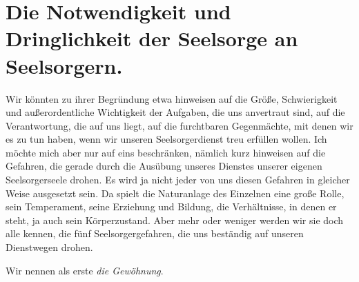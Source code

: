 \documentclass[a5paper,openany]{book}
\begin{document}
\chapter{Die Notwendigkeit und Dringlichkeit der Seelsorge an Seelsorgern.}
Wir könnten zu ihrer Begründung etwa hinweisen auf die Größe, Schwierigkeit und außerordentliche Wichtigkeit der Aufgaben, die uns anvertraut sind, auf die Verantwortung, die auf uns liegt, auf die furchtbaren Gegenmächte, mit denen wir es zu tun haben, wenn wir unseren Seelsorgerdienst treu erfüllen wollen. Ich möchte mich aber nur auf eins beschränken, nämlich kurz hinweisen auf die Gefahren, die gerade durch die Ausübung unseres Dienstes unserer eigenen Seelsorgerseele drohen. Es wird ja nicht jeder von uns diesen Gefahren in gleicher Weise ausgesetzt sein. Da spielt die Naturanlage des Einzelnen eine große Rolle, sein Temperament, seine Erziehung und Bildung, die Verhältnisse, in denen er steht, ja auch sein Körperzustand. Aber mehr oder weniger werden wir sie doch alle kennen, die fünf Seelsorgergefahren, die uns beständig auf unseren Dienstwegen drohen.
\par
Wir nennen als erste \emph{die Gewöhnung}.
\par
\end{document}
